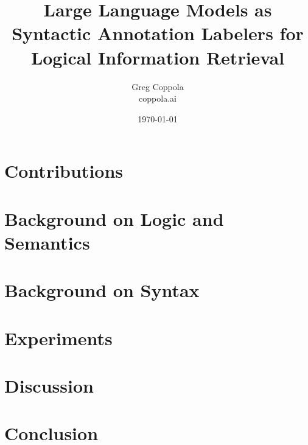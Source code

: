 \documentclass[11pt]{article}
\title{Large Language Models as Syntactic Annotation Labelers for Logical Information Retrieval}
\author{Greg Coppola\\coppola.ai}
\date{\today}
\begin{document}
\maketitle



\section{Contributions}


\section{Background on Logic and Semantics}


\section{Background on Syntax}


\section{Experiments}


\section{Discussion}


\section{Conclusion}




\end{document}
